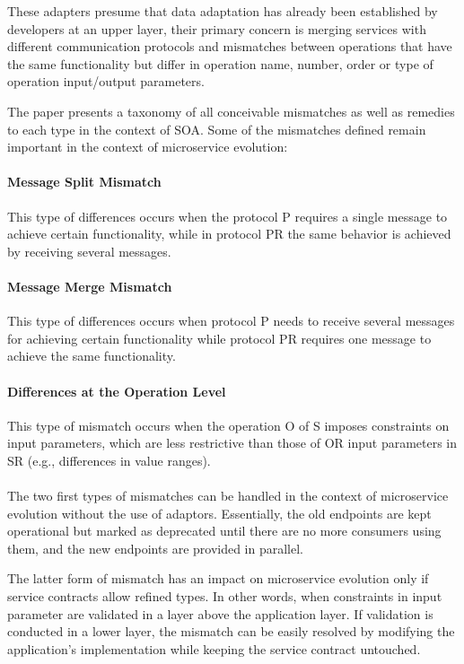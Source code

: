 These adapters presume that data adaptation has already been established by developers at an upper layer,
their primary concern is merging services with different communication protocols and mismatches between operations that have the
same functionality but differ in operation name, number, order or type of operation input/output parameters.

The paper \cite{15} presents a taxonomy of all conceivable mismatches as well as remedies to each type in the context of SOA.
Some of the mismatches defined remain important in the context of microservice evolution:

\paragraph{Message Split Mismatch}
This type of differences occurs when the protocol P requires a single message to achieve certain functionality,
while in protocol PR the same behavior is achieved by receiving several messages.

\paragraph{Message Merge Mismatch}
This type of differences occurs when protocol P needs to receive several messages for achieving certain
functionality while protocol PR requires one message to achieve the same functionality.

\paragraph{Differences at the Operation Level}
This type of mismatch occurs when the operation O of S imposes constraints on input parameters,
which are less restrictive than those of OR input parameters in SR (e.g., differences in value ranges).

\paragraph{}

The two first types of mismatches can be handled in the context of microservice evolution without the use of adaptors.
Essentially, the old endpoints are kept operational but marked as deprecated until there are no more consumers using them, and the new endpoints are provided in parallel.

The latter form of mismatch has an impact on microservice evolution only if service contracts allow refined types.
In other words, when constraints in input parameter are validated in a layer above the application layer.
If validation is conducted in a lower layer, the mismatch can be easily resolved by modifying the application's implementation while keeping the service contract untouched.

